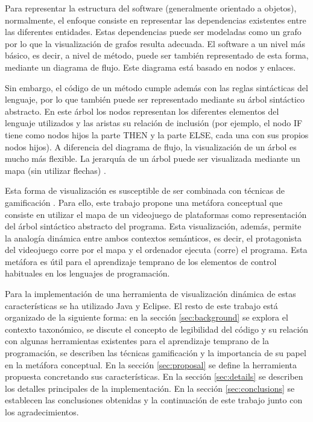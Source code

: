 \documentclass{llncs}
\begin{document}
Para representar la estructura del software (generalmente orientado a objetos), normalmente, el enfoque consiste en representar las dependencias existentes entre las diferentes entidades. Estas dependencias puede ser modeladas como un grafo por lo que la visualización de grafos resulta adecuada. El software a un nivel más básico, es decir, a nivel de método, puede ser también representado de esta forma, mediante un diagrama de flujo. Este diagrama está basado en nodos y enlaces.

Sin embargo, el código de un método cumple además con las reglas sintácticas del lenguaje, por lo que también puede ser representado mediante su árbol sintáctico abstracto. En este árbol los nodos representan los diferentes elementos del lenguaje utilizados y las aristas su relación de inclusión (por ejemplo, el nodo IF tiene como nodos hijos la parte THEN y la parte ELSE, cada una con sus propios nodos hijos). A diferencia del diagrama de flujo, la visualización de un árbol es mucho más flexible. La jerarquía de un árbol puede ser visualizada mediante un mapa (sin utilizar flechas) \cite{softwarevisualization}.

Esta forma de visualización es susceptible de ser combinada con técnicas de gamificación \cite{kumar2012gamification}. Para ello, este trabajo propone una metáfora conceptual que consiste en utilizar el mapa de un videojuego de plataformas como representación del árbol sintáctico abstracto del programa. Esta visualización, además, permite la analogía dinámica entre ambos contextos semánticos, es decir, el protagonista del videojuego corre por el mapa y el ordenador ejecuta (corre) el programa. Esta metáfora es útil para el aprendizaje temprano de los elementos de control habituales en los lenguajes de programación.

Para la implementación de una herramienta de visualización dinámica de estas características se ha utilizado Java y Eclipse. El resto de este trabajo está organizado de la siguiente forma: en la sección \ref{sec:background} se explora el contexto taxonómico, se discute el concepto de legibilidad del código y su relación con algunas herramientas existentes para el aprendizaje temprano de la programación, se describen las técnicas gamificación y la importancia de su papel en la metáfora conceptual. En la sección \ref{sec:proposal} se define la herramienta propuesta concretando sus características. En la sección \ref{sec:details} se describen los detalles principales de la implementación. En la sección \ref{sec:conclusions} se establecen las conclusiones obtenidas y la continuación de este trabajo junto con los agradecimientos. 
\end{document}
